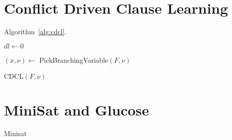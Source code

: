 \section{Conflict Driven Clause Learning}
\label{sec:cdcl}

Algorithm~\ref{alg:cdcl}.

\begin{algorithm}[!ht]
    \Input{}
    \Output{}

    {}

    $dl \leftarrow 0$

    {$(x, \nu) \leftarrow$ PickBranchingVariable$(F,\nu)$}

    \caption{CDCL$(F, \nu)$}
\label{alg:cdcl}
\end{algorithm}

\section{MiniSat and Glucose}
\label{sec:minisat}
Minisat~\cite{minisat}

